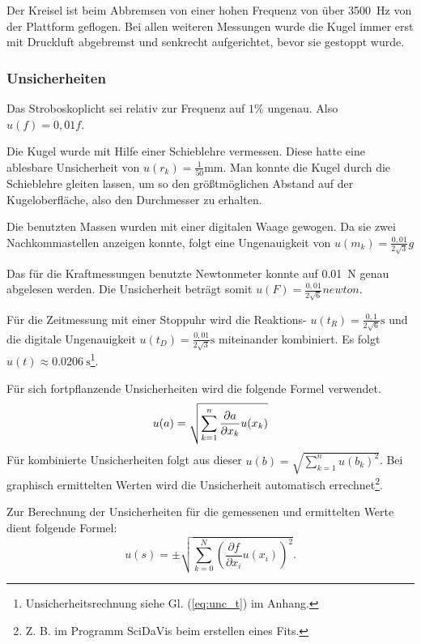 Der Kreisel ist beim Abbremsen von einer hohen Frequenz von über \SI{3500}{\hertz} von der Plattform geflogen.
Bei allen weiteren Messungen wurde die Kugel immer erst mit Druckluft abgebremst und senkrecht aufgerichtet, bevor sie gestoppt wurde.

\subsubsection{Unsicherheiten}

Das Stroboskoplicht sei relativ zur Frequenz auf $1\%$ ungenau.
Also $u(f) = 0,01 f$.

Die Kugel wurde mit Hilfe einer Schieblehre vermessen.
Diese hatte eine ablesbare Unsicherheit von $u(r_k) =\frac{1}{50}\si{\milli\meter}$.
Man konnte die Kugel durch die Schieblehre gleiten lassen, um so den größtmöglichen Abstand auf der Kugeloberfläche, also den Durchmesser zu erhalten.

Die benutzten Massen wurden mit einer digitalen Waage gewogen.
Da sie zwei Nachkommastellen anzeigen konnte, folgt eine Ungenauigkeit von $u(m_k) = \frac{0,01}{2\sqrt{3}}\si{g}$

Das für die Kraftmessungen benutzte Newtonmeter konnte auf \SI{0,01}{\newton} genau abgelesen werden.
Die Unsicherheit beträgt somit $u(F) = \frac{0,01}{2\sqrt{6}} \si{newton}$.

Für die Zeitmessung mit einer Stoppuhr wird die Reaktions- $u(t_R) = \frac{0,1}{2\sqrt6}\si{\second}$ und die digitale Ungenauigkeit $u(t_D) = \frac{0,01}{2\sqrt3}\si{\second}$ miteinander kombiniert.
Es folgt $u(t) \approx \SI{0,0206}{\second}$\footnote{Unsicherheitsrechnung siehe Gl. (\ref{eq:unc_t}) im Anhang.}.

Für sich fortpflanzende Unsicherheiten wird die folgende Formel verwendet.
\begin{equation}
\label{eq:unc_combined}
u(a) = \sqrt{\sum_{k=1}^{n} \pdv{a}{x_k} u(x_k)}
\end{equation}
Für kombinierte Unsicherheiten folgt aus dieser $u(b) = \sqrt{\sum_{k=1}^n u(b_k)^2}$.
Bei graphisch ermittelten Werten wird die Unsicherheit automatisch errechnet\footnote{Z. B. im Programm SciDaVis beim erstellen eines Fits.}.

Zur Berechnung der Unsicherheiten für die gemessenen und ermittelten Werte dient folgende Formel: 
\begin{equation*}
u(s) = \pm \sqrt{\sum_{k=0}^{N}\left( \frac{\partial f}{\partial x_i}u(x_i)\right) ^2}. 
\end{equation*}


